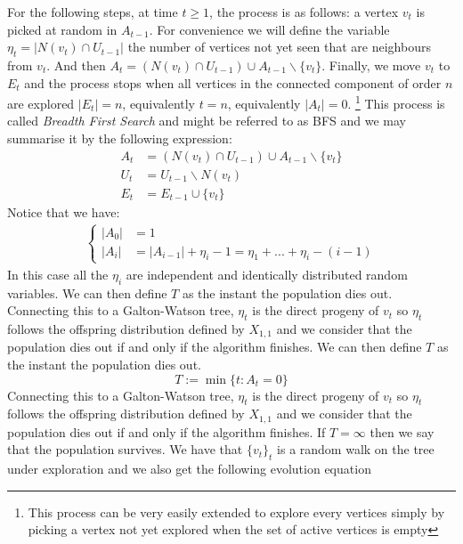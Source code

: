 \newline
For the following steps, at time $t \geq 1$, the process is as follows: a vertex $v_t$ is picked at random in $A_{t-1}$. 
For convenience we will define the variable $\eta_t = |N(v_t) \cap U_{t-1}|$ the number of vertices not yet seen that are neighbours from $v_t$.
And then $A_t = (N(v_t)\cap U_{t-1} ) \cup A_{t-1} \backslash \{v_t\}$.
Finally, we move $v_t$ to $E_t$ and the process stops when all vertices in the connected component of order $n$ are explored $|E_t| = n$, equivalently $t=n$, equivalently $|A_t| = 0$.
\footnote{This process can be very easily extended to explore every vertices simply by picking a vertex not yet explored when the set of active vertices is empty}
\newline
This process is called \emph{Breadth First Search} and might be referred to as BFS and we may summarise it by the following expression:
\begin{align}
    A_t &= (N(v_t) \cap U_{t-1})\cup A_{t-1} \backslash \{v_t\} \\
    U_t &= U_{t-1}\backslash N(v_t)  \\
    E_t &= E_{t-1}\cup \{v_t\}
\end{align}
Notice that we have:
\begin{align}\label{activatedV}
	\left\{\begin{array}{rl}
			|A_0| &= 1\\
			|A_i| &= |A_{i-1}| + \eta_i - 1 = \eta_1 + ... + \eta_i - ( i - 1)
	 \end{array}
	\right.
\end{align}
In this case all the $\eta_i$ are independent and identically distributed random variables.
We can then define $T$ as the instant the population dies out.
Connecting this to a Galton-Watson tree, $\eta_t$ is the direct progeny of $v_t$ so $\eta_t$ follows the offspring distribution defined by $X_{1, 1}$ and we consider that the population dies out if and only if the algorithm finishes.
We can then define $T$ as the instant the population dies out.
\begin{equation}\label{eq:defT}
	T := \min\{t: A_t = 0\}
\end{equation}
Connecting this to a Galton-Watson tree, $\eta_t$ is the direct progeny of $v_t$ so $\eta_t$ follows the offspring distribution defined by $X_{1, 1}$ and we consider that the population dies out if and only if the algorithm finishes.
If $T = \infty$ then we say that the population survives. 
\newline
We have that $\{v_t\}_t$ is a random walk on the tree under exploration and we also get the following evolution equation 
